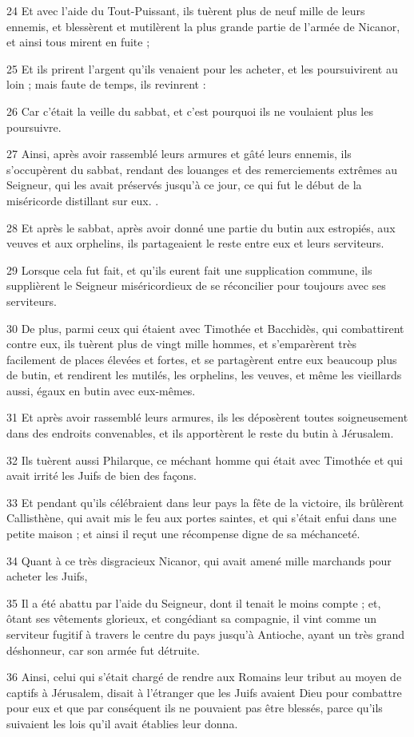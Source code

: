 \par 24 Et avec l'aide du Tout-Puissant, ils tuèrent plus de neuf mille de leurs ennemis, et blessèrent et mutilèrent la plus grande partie de l'armée de Nicanor, et ainsi tous mirent en fuite ;
\par 25 Et ils prirent l'argent qu'ils venaient pour les acheter, et les poursuivirent au loin ; mais faute de temps, ils revinrent :
\par 26 Car c'était la veille du sabbat, et c'est pourquoi ils ne voulaient plus les poursuivre.
\par 27 Ainsi, après avoir rassemblé leurs armures et gâté leurs ennemis, ils s'occupèrent du sabbat, rendant des louanges et des remerciements extrêmes au Seigneur, qui les avait préservés jusqu'à ce jour, ce qui fut le début de la miséricorde distillant sur eux. .
\par 28 Et après le sabbat, après avoir donné une partie du butin aux estropiés, aux veuves et aux orphelins, ils partageaient le reste entre eux et leurs serviteurs.
\par 29 Lorsque cela fut fait, et qu'ils eurent fait une supplication commune, ils supplièrent le Seigneur miséricordieux de se réconcilier pour toujours avec ses serviteurs.
\par 30 De plus, parmi ceux qui étaient avec Timothée et Bacchidès, qui combattirent contre eux, ils tuèrent plus de vingt mille hommes, et s'emparèrent très facilement de places élevées et fortes, et se partagèrent entre eux beaucoup plus de butin, et rendirent les mutilés, les orphelins, les veuves, et même les vieillards aussi, égaux en butin avec eux-mêmes.
\par 31 Et après avoir rassemblé leurs armures, ils les déposèrent toutes soigneusement dans des endroits convenables, et ils apportèrent le reste du butin à Jérusalem.
\par 32 Ils tuèrent aussi Philarque, ce méchant homme qui était avec Timothée et qui avait irrité les Juifs de bien des façons.
\par 33 Et pendant qu'ils célébraient dans leur pays la fête de la victoire, ils brûlèrent Callisthène, qui avait mis le feu aux portes saintes, et qui s'était enfui dans une petite maison ; et ainsi il reçut une récompense digne de sa méchanceté.
\par 34 Quant à ce très disgracieux Nicanor, qui avait amené mille marchands pour acheter les Juifs,
\par 35 Il a été abattu par l'aide du Seigneur, dont il tenait le moins compte ; et, ôtant ses vêtements glorieux, et congédiant sa compagnie, il vint comme un serviteur fugitif à travers le centre du pays jusqu'à Antioche, ayant un très grand déshonneur, car son armée fut détruite.
\par 36 Ainsi, celui qui s'était chargé de rendre aux Romains leur tribut au moyen de captifs à Jérusalem, disait à l'étranger que les Juifs avaient Dieu pour combattre pour eux et que par conséquent ils ne pouvaient pas être blessés, parce qu'ils suivaient les lois qu'il avait établies leur donna.

